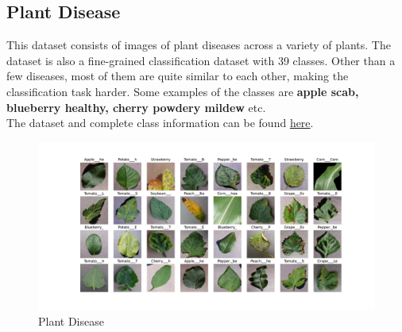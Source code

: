 \subsection{Plant Disease}
This dataset consists of images of plant diseases across a variety of plants. The dataset is also a fine-grained classification dataset with 39 classes. Other than a few diseases, most of them are quite similar to each other, making the classification task harder. Some examples of the classes are \textbf{apple scab, blueberry healthy, cherry powdery mildew} etc.\\
The dataset and complete class information can be found \href{https://www.kaggle.com/datasets/rajibdpi/plant-disease-dataset}{here}.
\begin{figure}[H]
    \centering
    \includegraphics[width=1\textwidth]{images/plantdisease.pdf}
    \caption{Plant Disease}
    \label{fig:plant}

\end{figure}

